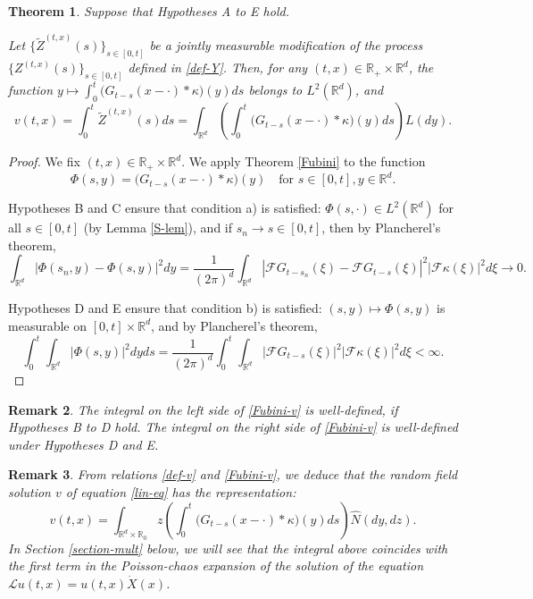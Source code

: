 \documentclass[12pt]{article}
\newtheorem{theorem}{Theorem}[section]
\newtheorem{remark}[theorem]{Remark}
\def\cF{\mathcal{F}}
\def\cL{\mathcal{L}}
\def\bR{\mathbb{R}}
\def\k{\kappa}
\begin{document}
\begin{theorem}
Suppose that Hypotheses A to E hold. 


Let $\{\widetilde{Z}^{(t,x)}(s)\}_{s \in [0,t]}$ be a jointly measurable modification of the process $\{Z^{(t,x)}(s)\}_{s \in [0,t]}$ defined in \eqref{def-Y}. Then, for any $(t,x)\in \bR_{+} \times \bR^d$, the function
$y \mapsto \int_0^t \big(G_{t-s}(x-\cdot)*\k\big)(y)ds$ belongs to  $L^2(\bR^d)$, and
\begin{equation}
\label{Fubini-v}
v(t,x)=\int_0^t \widetilde{Z}^{(t,x)}(s) ds=\int_{\bR^d} \left(\int_0^t \big(G_{t-s}(x-\cdot)*\k\big)(y)ds\right) L(dy).
\end{equation}
\end{theorem}

\begin{proof}
We fix $(t,x) \in \bR_{+} \times \bR^d$. We apply Theorem \ref{Fubini} to the function
\[
\Phi(s,y)=\big(G_{t-s}(x-\cdot)*\k\big)(y) \quad \mbox{for $s \in [0,t],y \in \bR^d$}.
\]

Hypotheses B and C ensure that condition a) is satisfied: $\Phi(s,\cdot) \in L^2(\bR^d)$ for all $s \in [0,t]$ (by Lemma \ref{S-lem}), and %
if $s_n \to s \in [0,t]$, then by Plancherel's theorem,
\[
\int_{\bR^d} |\Phi(s_n,y)-\Phi(s,y)|^2 dy =\frac{1}{(2\pi)^d} \int_{\bR^d} |\cF G_{t-s_n}(\xi)-\cF G_{t-s}(\xi)|^2 |\cF \k (\xi)|^2 d\xi \to 0.
\]


Hypotheses D and E ensure that condition b) is satisfied: $(s,y) \mapsto \Phi(s,y)$ is measurable on $[0,t] \times \bR^d$, and by Plancherel's theorem,
\[
\int_0^t \int_{\bR^d}|\Phi(s,y)|^2 dyds=\frac{1}{(2\pi)^d}\int_0^t \int_{\bR^d} |\cF G_{t-s}(\xi)|^2 |\cF \k(\xi)|^2 d\xi<\infty.
\]
\end{proof}

\begin{remark}
{\rm The integral on the {\em left} side of \eqref{Fubini-v} is well-defined, if Hypotheses B to D hold. The integral on the {\em right} side of \eqref{Fubini-v} is well-defined under
Hypotheses D and E.
}
\end{remark}




\begin{remark}
{\rm
From relations \eqref{def-v} and \eqref{Fubini-v}, we deduce that the random field solution $v$ of equation \eqref{lin-eq} has the representation:
\[
v(t,x)=\int_{\bR^d \times \bR_0} z \left( \int_0^t \big(G_{t-s}(x-\cdot)*\k\big)(y) ds\right) \widehat{N}(dy,dz).
\]
In Section \ref{section-mult} below, we will see that the integral above coincides with the first term in the Poisson-chaos expansion of the solution of the equation $\cL u(t,x) =u(t,x)\dot{X}(x)$.
}
\end{remark}
\end{document}
